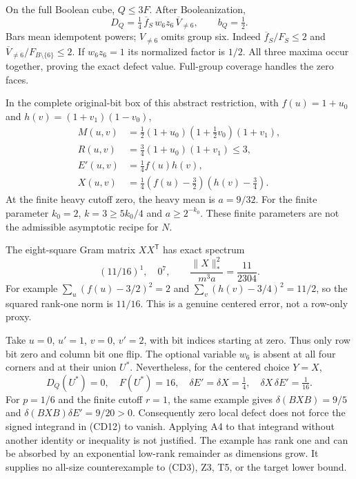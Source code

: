 \documentclass[11pt]{article}
\begin{document}
On the full Boolean cube, $Q\le3F$. After Booleanization,
\[
 D_Q=\tfrac14\,\overline f_S\,w_6z_6\,\overline V_{\ne6},
 \qquad b_Q=\tfrac12.                                  \tag{CD14}
\]
Bars mean idempotent powers; $V_{\ne6}$ omits group six.
Indeed $\overline f_S/F_S\le2$ and
$\overline V_{\ne6}/F_{B\setminus\{6\}}\le2$.
If $w_6z_6=1$ its normalized factor is $1/2$.
All three maxima occur together, proving the exact defect value.
Full-group coverage handles the zero faces.

In the complete original-bit box of this abstract restriction,
with $f(u)=1+u_0$ and $h(v)=(1+v_1)(1-v_0)$,
\[
 \begin{split}
 M(u,v)&=\tfrac12(1+u_0)(1+\tfrac12v_0)(1+v_1),\\
 R(u,v)&=\tfrac34(1+u_0)(1+v_1)\le3,\\
 E'(u,v)&=\tfrac14 f(u)h(v),\\
 X(u,v)&=\tfrac14(f(u)-\tfrac32)(h(v)-\tfrac34).
                                                               \tag{CD15}
 \end{split}
\]
At the finite heavy cutoff zero, the heavy mean is $a=9/32$.
For the finite parameter $k_0=2$, $k=3\ge5k_0/4$ and
$a\ge2^{-k_0}$. These finite parameters are not the admissible
asymptotic recipe for $N$.

The eight-square Gram matrix $XX^{\mathsf T}$ has exact spectrum
\[
           (11/16)^1,\quad 0^7,\qquad
 \frac{\|X\|_*^2}{m^3a}=\frac{11}{2304}.                \tag{CD16}
\]
For example $\sum_u(f(u)-3/2)^2=2$ and
$\sum_v(h(v)-3/4)^2=11/2$, so the squared rank-one norm is
$11/16$. This is a genuine centered error, not a row-only proxy.

Take $u=0$, $u'=1$, $v=0$, $v'=2$, with bit indices starting
at zero. Thus only row bit zero and column bit one flip.
The optional variable $w_6$ is absent at all four corners and
at their union $U^*$. Nevertheless, for the centered choice $Y=X$,
\[
 D_Q(U^*)=0,\quad F(U^*)=16,\quad
 \delta E'=\delta X=\tfrac14,\quad
                          \delta X\,\delta E'=\tfrac1{16}. \tag{CD17}
\]
For $p=1/6$ and the finite cutoff $r=1$, the same example gives
$\delta(BXB)=9/5$ and
$\delta(BXB)\delta E'=9/20>0$.
Consequently zero local defect does not force the signed integrand
in (CD12) to vanish. Applying A4 to that integrand without another
identity or inequality is not justified.
The example has rank one and can be absorbed by an exponential
low-rank remainder as dimensions grow. It supplies no all-size
counterexample to (CD3), Z3, T5, or the target lower bound.
\end{document}
